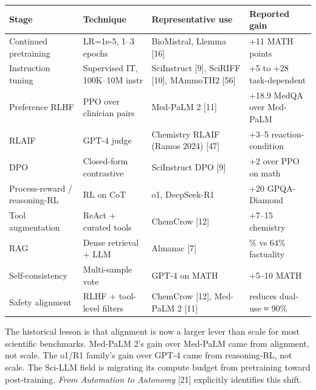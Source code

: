 {\def\LTcaptype{none} %
\begin{longtable}[]{@{}
  >{\raggedright\arraybackslash}p{}
  >{\raggedright\arraybackslash}p{}
  >{\raggedright\arraybackslash}p{}
  >{\raggedright\arraybackslash}p{}@{}}
\toprule\noalign{}
\begin{minipage}[b]{\linewidth}\raggedright
Stage
\end{minipage} & \begin{minipage}[b]{\linewidth}\raggedright
Technique
\end{minipage} & \begin{minipage}[b]{\linewidth}\raggedright
Representative use
\end{minipage} & \begin{minipage}[b]{\linewidth}\raggedright
Reported gain
\end{minipage} \\
\midrule\noalign{}
\endhead
\bottomrule\noalign{}
\endlastfoot
Continued pretraining & LR=1e-5, 1--3 epochs & BioMistral, Llemma {[}16{]} & +11 MATH points \\
Instruction tuning & Supervised IT, 100K--10M instr & SciInstruct {[}9{]}, SciRIFF {[}10{]}, MAmmoTH2 {[}56{]} & +5 to +28 task-dependent \\
Preference RLHF & PPO over clinician pairs & Med-PaLM 2 {[}11{]} & +18.9 MedQA over Med-PaLM \\
RLAIF & GPT-4 judge & Chemistry RLAIF (Ramos 2024) {[}47{]} & +3--5 reaction-condition \\
DPO & Closed-form contrastive & SciInstruct DPO {[}9{]} & +2 over PPO on math \\
Process-reward / reasoning-RL & RL on CoT & o1, DeepSeek-R1 & +20 GPQA-Diamond \\
Tool augmentation & ReAct + curated tools & ChemCrow {[}12{]} & +7--15 chemistry \\
RAG & Dense retrieval + LLM & Almanac {[}7{]} & 91\% vs 64\% factuality \\
Self-consistency & Multi-sample vote & GPT-4 on MATH & +5--10 MATH \\
Safety alignment & RLHF + tool-level filters & ChemCrow {[}12{]}, Med-PaLM 2 {[}11{]} & reduces dual-use ≈ 90\% \\
\end{longtable}
}

The historical lesson is that alignment is now a larger lever than scale for most scientific benchmarks. Med-PaLM 2's gain over Med-PaLM came from alignment, not scale. The o1/R1 family's gain over GPT-4 came from reasoning-RL, not scale. The Sci-LLM field is migrating its compute budget from pretraining toward post-training. \emph{From Automation to Autonomy} {[}21{]} explicitly identifies this shift.

